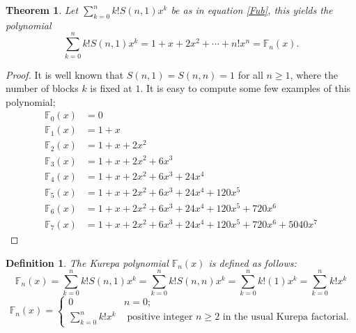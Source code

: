 \documentclass[pdflatex,sn-mathphys-num]{sn-jnl}%
\newtheorem{theorem}{Theorem}
\newtheorem{definition}{Definition}
\theoremstyle{thmstyleone}%
\theoremstyle{thmstyletwo}%
\theoremstyle{thmstylethree}%
\begin{document}
\begin{theorem}\label{FK}
Let $\sum_{k=0}^n k! S(n,1)x^k$ be as in equation \ref{Fub}, this yields the polynomial
$$\sum_{k=0}^n k! S(n,1)x^k=1+x+2x^2+\cdots+n!x^n=\mathbb{F}_{n}(x).$$   
\end{theorem}
\begin{proof}
It is well known that $S(n,1)=S(n,n)=1$ for all $n\geq 1$, where the number of blocks $k$ is fixed at $1$. It is easy to compute some few examples of this polynomial;
\begin{align}\label{PF}
\mathbb{F}_{0}(x) &= 0\\ \nonumber
\mathbb{F}_{1}(x) &= 1 + x\\  \nonumber
\mathbb{F}_{2}(x) &= 1 + x + 2x^2\\  \nonumber
\mathbb{F}_{3}(x) &= 1 + x + 2x^2 + 6x^3\\  \nonumber
\mathbb{F}_{4}(x) &= 1 + x + 2x^2 + 6x^3 + 24x^4\\  \nonumber
\mathbb{F}_{5}(x) &= 1 + x + 2x^2 + 6x^3 + 24x^4 + 120x^5\\  \nonumber
\mathbb{F}_{6}(x) &= 1 + x + 2x^2 + 6x^3 + 24x^4 + 120x^5 + 720x^6\\  \nonumber
\mathbb{F}_{7}(x) &= 1 + x + 2x^2 + 6x^3 + 24x^4 + 120x^5 + 720x^6 + 5040x^7
\end{align}
\end{proof}

\begin{definition}
    The Kurepa polynomial $\mathbb{F}_n(x)$ is defined as follows:
    \begin{equation*}
\mathbb{F}_n(x)=\sum_{k=0}^n k! S(n,1)x^k=\sum_{k=0}^n k! S(n,n)x^k=\sum_{k=0}^n k!(1)x^k=\sum_{k=0}^n k!x^k
 \end{equation*}
 \begin{equation*}
\mathbb{F}_n(x)=
\begin{cases}
	\text{0}    & \text{$n=0$;}\\
	\text{$\sum_{k=0}^n k!x^k$}   & \text{ positive integer $n\geq 2$ in the usual Kurepa factorial}.
\end{cases}
 \end{equation*}
\end{definition}
\end{document}
